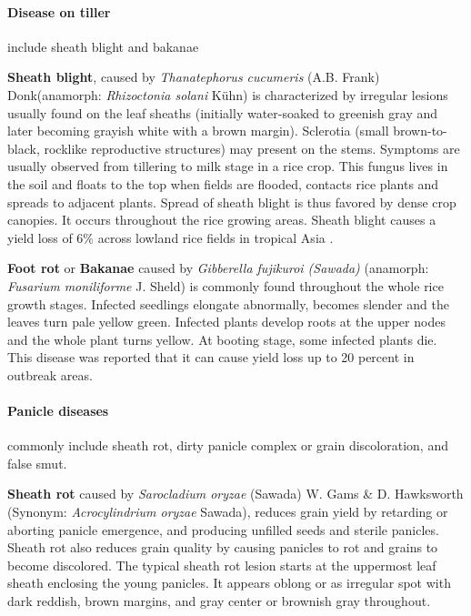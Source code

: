 \documentclass[12pt, oneside]{report}
\begin{document}
\paragraph{Disease on tiller} include sheath blight and bakanae

 \textbf{Sheath blight}, caused by \textit{Thanatephorus cucumeris} (A.B. Frank) Donk(anamorph: \textit{Rhizoctonia solani} K\"uhn) is characterized by irregular lesions usually found on the leaf sheaths (initially water-soaked to greenish gray and later becoming grayish white with a brown margin). Sclerotia (small brown-to-black, rocklike reproductive structures) may present on the stems. Symptoms are usually observed from tillering to milk stage in a rice crop. This fungus lives in the soil and floats to the top when fields are flooded, contacts rice plants and spreads to adjacent plants. Spread of sheath blight is thus favored by dense crop canopies. It occurs throughout the rice growing areas. Sheath blight causes a yield loss of 6\% across lowland rice fields in tropical Asia \cite{Savary:2006to}. 

\textbf{Foot rot} or \textbf{Bakanae} caused by \textit{Gibberella fujikuroi (Sawada)} (anamorph: \textit{Fusarium moniliforme} J. Sheld) is commonly found throughout the whole rice growth stages. Infected seedlings elongate abnormally, becomes slender and the leaves turn pale yellow green. Infected plants develop roots at the upper nodes and the whole plant turns yellow. At booting stage, some infected plants die. This disease was reported that it can cause yield loss up to 20 percent in outbreak areas.

\paragraph{Panicle diseases} commonly include sheath rot, dirty panicle complex or grain discoloration, and false smut.

\textbf{Sheath rot} caused by \textit{Sarocladium oryzae} (Sawada) W. Gams \& D. Hawksworth (Synonym: \textit{Acrocylindrium oryzae} Sawada), reduces grain yield by retarding or aborting panicle emergence, and producing unfilled seeds and sterile panicles. Sheath rot also reduces grain quality by causing panicles to rot and grains to become discolored. The typical sheath rot lesion starts at the uppermost leaf sheath enclosing the young panicles. It appears oblong or as irregular spot with dark reddish, brown margins, and gray center or brownish gray throughout.
\end{document}
